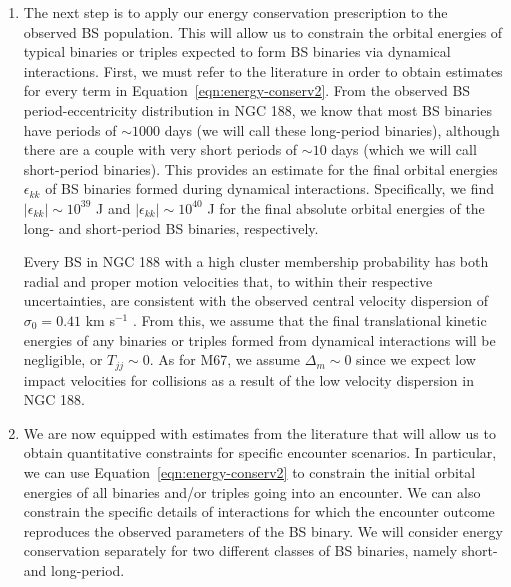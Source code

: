 \begin{enumerate}
\item The next step is to apply our energy conservation prescription
  to the observed BS population.  This will allow us to constrain the orbital
  energies of typical binaries or triples expected to form BS binaries
  via dynamical interactions.  First, we must refer to the literature
  in order to obtain estimates for every term in
  Equation~\ref{eqn:energy-conserv2}. 
From the observed BS period-eccentricity distribution in NGC 188, we know
that most BS binaries have periods of $\sim 1000$ days (we will call
these long-period binaries), although there
are a couple with very short periods of $\sim 10$ days (which we will
call short-period binaries).  This provides 
an estimate for the final orbital energies $\epsilon_{kk}$ of BS binaries
formed during dynamical interactions.  Specifically, we find
$|\epsilon_{kk}| \sim 10^{39}$ J and $|\epsilon_{kk}| \sim 10^{40}$ J for the
final absolute orbital energies of the long- and short-period BS
binaries, respectively.

Every BS in NGC 188 with a high cluster membership probability
has both radial and proper motion velocities that, to within their
respective uncertainties, are consistent with the observed central
velocity dispersion of $\sigma_0 = 0.41$ km s$^{-1}$ \citep{platais03,
  geller08, geller09}.  From this, we assume that the
final translational kinetic energies of any binaries or triples formed
from dynamical interactions will be negligible, or $T_{jj} \sim 0$.  As
for M67, we assume $\Delta_m 
\sim 0$ since we expect low impact velocities for collisions as a
result of the low velocity dispersion in NGC 188.

\item We are now equipped with estimates from the literature that will
  allow us to obtain quantitative constraints for specific encounter
  scenarios.  In particular, we can use
  Equation~\ref{eqn:energy-conserv2} to constrain the initial 
  orbital energies of all binaries and/or triples going into an 
  encounter.  We can also constrain the specific details of
  interactions for which the encounter outcome reproduces the observed
  parameters of the BS binary.  We will consider 
  energy conservation separately for two different classes of BS
  binaries, namely short- and long-period. 


\end{enumerate}
